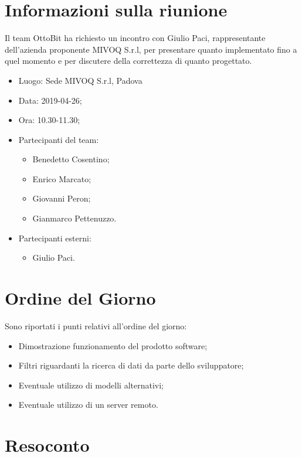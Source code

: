 \documentclass[11pt,a4paper]{article}
\begin{document}
	\section{Informazioni sulla riunione}
	Il team OttoBit ha richiesto un incontro con Giulio Paci, rappresentante dell'azienda proponente MIVOQ S.r.l, per presentare quanto implementato fino a quel momento e per discutere della correttezza di quanto progettato.
	\begin{itemize}
		\item Luogo: Sede MIVOQ S.r.l, Padova
		\item Data: 2019-04-26;
		\item Ora: 10.30-11.30;
		\item Partecipanti del team:
		\begin{itemize}
			\item Benedetto Cosentino;
			\item Enrico Marcato;
			\item Giovanni Peron;
			\item Gianmarco Pettenuzzo.
			
		\end{itemize}
	\item Partecipanti esterni:
	\begin{itemize}
		\item Giulio Paci.
	\end{itemize}
	\end{itemize}
	
	\section{Ordine del Giorno}
	Sono riportati i punti relativi all'ordine del giorno:
	\begin{itemize}
		\item Dimostrazione funzionamento del prodotto software;
		\item Filtri riguardanti la ricerca di dati da parte dello sviluppatore;
		\item Eventuale utilizzo di modelli alternativi;
		\item Eventuale utilizzo di un server remoto.
	\end{itemize}
	
	\section{Resoconto}
\end{document}
